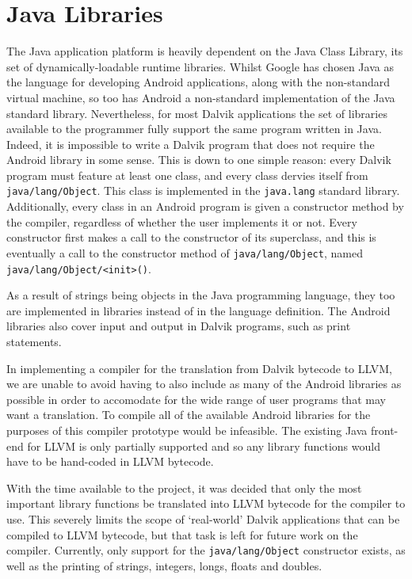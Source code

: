 \section {Java Libraries}
\label{sec:javalib}

The Java application platform is heavily dependent on the Java Class Library, its set of dynamically-loadable runtime libraries. Whilst Google has chosen Java as the language for developing Android applications, along with the non-standard virtual machine, so too has Android a non-standard implementation of the Java standard library. Nevertheless, for most Dalvik applications the set of libraries available to the programmer fully support the same program written in Java. Indeed, it is impossible to write a Dalvik program that does not require the Android library in some sense. This is down to one simple reason: every Dalvik program must feature at least one class, and every class dervies itself from \verb|java/lang/Object|. This class is implemented in the \verb|java.lang| standard library. Additionally, every class in an Android program is given a constructor method by the compiler, regardless of whether the user implements it or not. Every constructor first makes a call to the constructor of its superclass, and this is eventually a call to the constructor method of \verb|java/lang/Object|, named \verb|java/lang/Object/<init>()|.

As a result of strings being objects in the Java programming language, they too are implemented in libraries instead of in the language definition. The Android libraries also cover input and output in Dalvik programs, such as print statements.

In implementing a compiler for the translation from Dalvik bytecode to LLVM, we are unable to avoid having to also include as many of the Android libraries as possible in order to accomodate for the wide range of user programs that may want a translation. To compile all of the available Android libraries for the purposes of this compiler prototype would be infeasible. The existing Java front-end for LLVM is only partially supported and so any library functions would have to be hand-coded in LLVM bytecode.

With the time available to the project, it was decided that only the most important library functions be translated into LLVM bytecode for the compiler to use. This severely limits the scope of `real-world' Dalvik applications that can be compiled to LLVM bytecode, but that task is left for future work on the compiler. Currently, only support for the \verb|java/lang/Object| constructor exists, as well as the printing of strings, integers, longs, floats and doubles.
